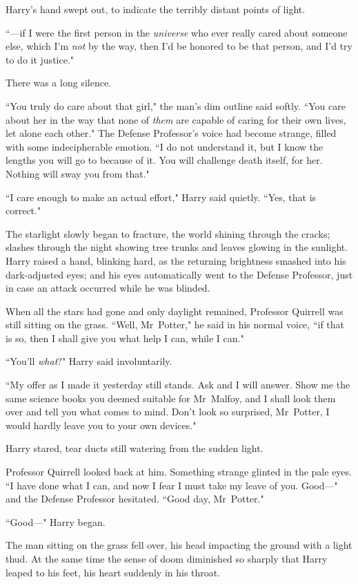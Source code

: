 Harry's hand swept out, to indicate the terribly distant points of light.

``—if I were the first person in the \emph{universe} who ever really cared about someone else, which I'm \emph{not} by the way, then I'd be honored to be that person, and I'd try to do it justice."

There was a long silence.

``You truly do care about that girl," the man's dim outline said softly. ``You care about her in the way that none of \emph{them} are capable of caring for their own lives, let alone each other." The Defense Professor's voice had become strange, filled with some indecipherable emotion. ``I do not understand it, but I know the lengths you will go to because of it. You will challenge death itself, for her. Nothing will sway you from that."

``I care enough to make an actual effort," Harry said quietly. ``Yes, that is correct."

The starlight slowly began to fracture, the world shining through the cracks; slashes through the night showing tree trunks and leaves glowing in the sunlight. Harry raised a hand, blinking hard, as the returning brightness smashed into his dark-adjusted eyes; and his eyes automatically went to the Defense Professor, just in case an attack occurred while he was blinded.

When all the stars had gone and only daylight remained, Professor Quirrell was still sitting on the grass. ``Well, Mr~Potter," he said in his normal voice, ``if that is so, then I shall give you what help I can, while I can."

``You'll \emph{what}?" Harry said involuntarily.

``My offer as I made it yesterday still stands. Ask and I will answer. Show me the same science books you deemed suitable for Mr~Malfoy, and I shall look them over and tell you what comes to mind. Don't look so surprised, Mr~Potter, I would hardly leave you to your own devices."

Harry stared, tear ducts still watering from the sudden light.

Professor Quirrell looked back at him. Something strange glinted in the pale eyes. ``I have done what I can, and now I fear I must take my leave of you. Good—" and the Defense Professor hesitated. ``Good day, Mr~Potter."

``Good—" Harry began.

The man sitting on the grass fell over, his head impacting the ground with a light thud. At the same time the sense of doom diminished so sharply that Harry leaped to his feet, his heart suddenly in his throat.

